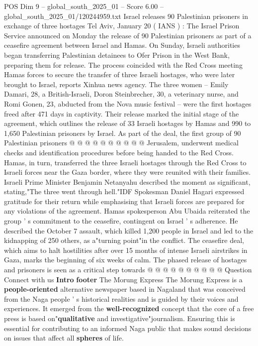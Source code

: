 \begin{textsample}{POS Dim 9 – global\_south\_2025\_01 – Score 6.00 – global\_south\_2025\_01/120244959.txt}  \label{ex:f9_pos_341}
Israel releases 90 Palestinian prisoners in exchange of three hostages Tel Aviv, January 20 ( IANS ) : The Israel Prison Service announced on Monday the release of 90 Palestinian prisoners as part of a ceasefire agreement between Israel and Hamas.
On Sunday, Israeli authorities began transferring Palestinian detainees to Ofer Prison in the West Bank, preparing them for release.
The process coincided with the Red Cross meeting Hamas forces to secure the transfer of three Israeli hostages, who were later brought to Israel, reports Xinhua news agency.
The three women -- Emily Damari, 28, a British-Israeli, Doron Steinbrecher, 30, a veterinary nurse, and Romi Gonen, 23, abducted from the Nova music festival -- were the first hostages freed after 471 days in captivity.
Their release marked the initial stage of the agreement, which outlines the release of 33 Israeli hostages by Hamas and 990 to 1,650 Palestinian prisoners by Israel.
As part of the deal, the first group of 90 Palestinian prisoners @ @ @ @ @ @ @ @ @ @ Jerusalem, underwent medical checks and identification procedures before being handed to the Red Cross.
Hamas, in turn, transferred the three Israeli hostages through the Red Cross to Israeli forces near the Gaza border, where they were reunited with their families.
Israeli Prime Minister Benjamin Netanyahu described the moment as significant, stating,"The three went through hell."IDF Spokesman Daniel Hagari expressed gratitude for their return while emphasising that Israeli forces are prepared for any violations of the agreement.
Hamas spokesperson Abu Ubaida reiterated the group ' s commitment to the ceasefire, contingent on Israel ' s adherence.
He described the October 7 assault, which killed 1,200 people in Israel and led to the kidnapping of 250 others, as a"turning point"in the conflict.
The ceasefire deal, which aims to halt hostilities after over 15 months of intense Israeli airstrikes in Gaza, marks the beginning of six weeks of calm.
The phased release of hostages and prisoners is seen as a critical step towards @ @ @ @ @ @ @ @ @ @ Question Connect with us \textbf{Intro} \textbf{footer} The Morung Express The Morung Express is a \textbf{people-oriented} alternative newspaper based in Nagaland that was conceived from the Naga people ' s historical realities and is guided by their voices and experiences.
It emerged from the \textbf{well-recognized} concept that the core of a free press is based on"\textbf{qualitative} and investigative"journalism.
Ensuring this is essential for contributing to an informed Naga public that makes sound decisions on issues that affect all \textbf{spheres} of life.

\end{textsample}
